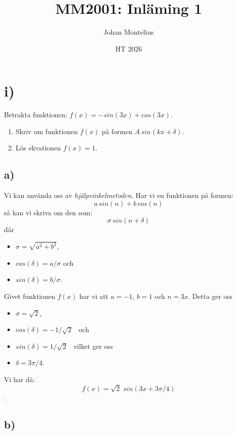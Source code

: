 \documentclass[a4paper, 11pt]{article}
\begin{document}
\title{
    \textbf{MM2001: Inläming 1}
}
\author{Johan Montelius}
\date{HT 2026}

\maketitle

\section*{i)}

Betrakta funktionen: $f(x) = -sin(3x) + cos(3x)$.
\begin{enumerate}[label=\alph*)]
  \item Skriv om funktionen $f(x)$ på formen $A\, sin(kx + \delta)$.
  \item Lös ekvationen  $f(x) = 1$.
\end{enumerate}

\subsection*{a)}

\noindent Vi kan använda oss av {\em hjälpvinkelmetoden}. Har vi en funktionen
på formen:
$$ a\, sin(n) + b\, cos(n)$$ så kan vi skriva om den som:
$$ \sigma\, sin(n + \delta) $$
där
\begin{itemize}
  \item $\sigma = \sqrt{a^2 + b^2}$,
  \item $cos(\delta) = a/\sigma$ och
  \item $sin(\delta) = b/\sigma$.
\end{itemize}

\vspace{5pt}

Givet funktionen $f(x)$ har vi att $a = -1$, $b = 1$ och $n =
3x$. Detta ger oss

\begin{itemize}
\item $\sigma = \sqrt{2}$,
\item $cos(\delta) = -1/\sqrt{2}$ \ och
\item $sin(\delta) = 1/\sqrt{2}$ \ vilket ger oss
\item $\delta = 3\pi/4 $.
\end{itemize}
Vi har då:
$$ f(x) = \sqrt{2} \; sin(3x + 3\pi/4) $$.


\subsection*{b)}
\end{document}
